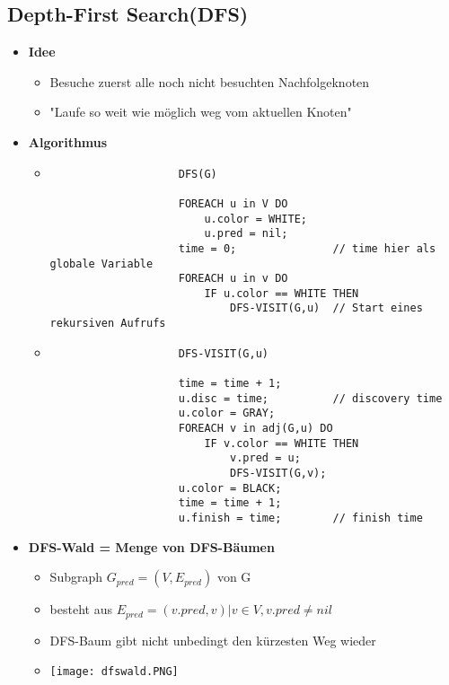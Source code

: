 \subsection{Depth-First Search(DFS)}
    \begin{itemize}
        \item \textbf{Idee}
            \begin{itemize}
                \item Besuche zuerst alle noch nicht besuchten Nachfolgeknoten
                \item \string"Laufe so weit wie möglich weg vom aktuellen Knoten\string"
            \end{itemize}

        \item \textbf{Algorithmus}
            \begin{itemize}
                \item[]
                    \begin{verbatim}
                    DFS(G)

                    FOREACH u in V DO
                        u.color = WHITE;
                        u.pred = nil;
                    time = 0;               // time hier als globale Variable
                    FOREACH u in v DO
                        IF u.color == WHITE THEN
                            DFS-VISIT(G,u)  // Start eines rekursiven Aufrufs
                    \end{verbatim}
                \item[]
                    \begin{verbatim}
                    DFS-VISIT(G,u)

                    time = time + 1;
                    u.disc = time;          // discovery time
                    u.color = GRAY;
                    FOREACH v in adj(G,u) DO
                        IF v.color == WHITE THEN
                            v.pred = u;
                            DFS-VISIT(G,v);
                    u.color = BLACK;
                    time = time + 1;
                    u.finish = time;        // finish time
                    \end{verbatim}
            \end{itemize}

        \item \textbf{DFS-Wald = Menge von DFS-Bäumen}
            \begin{itemize}
                \item Subgraph $G_{pred}=(V,E_{pred})$ von G
                \item besteht aus $E_{pred} = {(v.pred,v)|v \in V, v.pred \neq nil}$
                \item DFS-Baum gibt nicht unbedingt den kürzesten Weg wieder
                \item[] \texttt{[image: dfswald.PNG]}
            \end{itemize}
        

\end{itemize}
